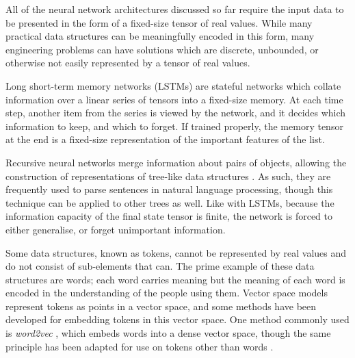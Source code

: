 \documentclass[../../main.tex]{subfiles}
\begin{document}
All of the neural network architectures discussed so far require the input data to be presented in the form of a fixed-size tensor of real values.
While many practical data structures can be meaningfully encoded in this form, many engineering problems can have solutions which are discrete,
unbounded, or otherwise not easily represented by a tensor of real values.

Long short-term memory networks (LSTMs) \cite{hochreiter97} are stateful networks which collate information over a linear series of tensors into a fixed-size memory.
At each time step, another item from the series is viewed by the network, and it decides which information to keep, and which to forget.
If trained properly, the memory tensor at the end is a fixed-size representation of the important features of the list.

Recursive neural networks merge information about pairs of objects, allowing the construction of representations of tree-like data structures \cite{socher11}.
As such, they are frequently used to parse sentences in natural language processing, though this technique can be applied to other trees as well.
Like with LSTMs, because the information capacity of the final state tensor is finite, the network is forced to either generalise, or forget unimportant information.

Some data structures, known as tokens, cannot be represented by real values and do not consist of sub-elements that can.
The prime example of these data structures are words; each word carries meaning but the meaning of each word is encoded in the understanding of the people using them.
Vector space models represent tokens as points in a vector space, and some methods have been developed for embedding tokens in this vector space.
One method commonly used is \emph{word2vec} \cite{mikolov13}, which embeds words into a dense vector space, though the same principle
has been adapted for use on tokens other than words \cite{le14}.
\end{document}
